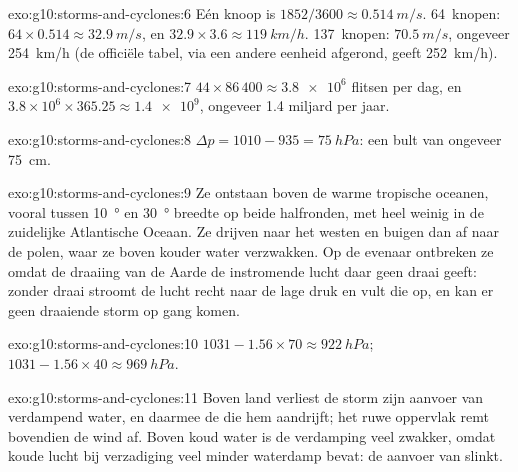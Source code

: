 \begin{solution}{exo:g10:storms-and-cyclones:6}
Eén knoop is $1852/3600 \approx \qty{0.514}{m/s}$. \num{64}~knopen: $64 \times
0.514 \approx \qty{32.9}{m/s}$, en $32.9 \times 3.6 \approx
\qty{119}{km/h}$. \num{137}~knopen: $\qty{70.5}{m/s}$, ongeveer
\qty{254}{km/h} (de officiële tabel, via een andere eenheid afgerond, geeft
\qty{252}{km/h}).
\end{solution}

\begin{solution}{exo:g10:storms-and-cyclones:7}
$44 \times 86\,400 \approx \num{3.8e6}$ flitsen per dag, en $3.8\times10^6
\times 365.25 \approx \num{1.4e9}$, ongeveer 1.4 miljard per jaar.
\end{solution}

\begin{solution}{exo:g10:storms-and-cyclones:8}
$\Delta p = 1010 - 935 = \qty{75}{hPa}$: een bult van ongeveer \qty{75}{cm}.
\end{solution}

\begin{solution}{exo:g10:storms-and-cyclones:9}
Ze ontstaan boven de warme tropische oceanen, vooral tussen \qty{10}{\degree} en
\qty{30}{\degree} breedte op beide halfronden, met heel weinig in de zuidelijke
Atlantische Oceaan. Ze drijven naar het westen en buigen dan af naar de polen,
waar ze boven kouder water verzwakken. Op de evenaar ontbreken ze omdat de
draaiing van de Aarde de instromende lucht daar geen draai geeft: zonder draai
stroomt de lucht recht naar de lage druk en vult die op, en kan er geen
draaiende storm op gang komen.
\end{solution}

\begin{solution}{exo:g10:storms-and-cyclones:10}
$1031 - 1.56 \times 70 \approx \qty{922}{hPa}$; $1031 - 1.56 \times 40
\approx \qty{969}{hPa}$.
\end{solution}

\begin{solution}{exo:g10:storms-and-cyclones:11}
Boven land verliest de storm zijn aanvoer van verdampend water, en daarmee de
 die hem aandrijft; het ruwe oppervlak remt bovendien de wind af.
Boven koud water is de verdamping veel zwakker, omdat koude lucht bij
verzadiging veel minder waterdamp bevat: de aanvoer van  slinkt.
\end{solution}

